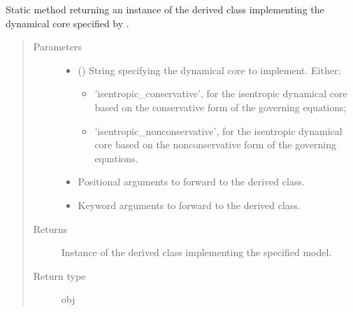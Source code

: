 \documentclass[letterpaper,10pt,english]{sphinxmanual}
\begin{document}
\begin{fulllineitems}
\begin{fulllineitems}
\label{\detokenize{api:tasmania.dycore.dycore.DynamicalCore.factory}}
Static method returning an instance of the derived class implementing the dynamical core specified by .
\begin{quote}\begin{description}
\item[{Parameters}] \leavevmode\begin{itemize}
\item {} 
 () \textendash{} 
String specifying the dynamical core to implement. Either:
\begin{itemize}
\item {} 
’isentropic\_conservative’, for the isentropic dynamical core based on the conservative form of                                        the governing equations;

\item {} 
’isentropic\_nonconservative’, for the isentropic dynamical core based on the nonconservative form of                                  the governing equations.

\end{itemize}


\item {} 
 \textendash{} Positional arguments to forward to the derived class.

\item {} 
 \textendash{} Keyword arguments to forward to the derived class.

\end{itemize}

\item[{Returns}] \leavevmode
Instance of the derived class implementing the specified model.

\item[{Return type}] \leavevmode
obj

\end{description}\end{quote}

\end{fulllineitems}



\end{fulllineitems}
\end{document}

